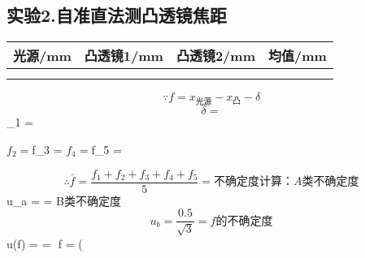 \subsection*{实验2.自准直法测凸透镜焦距}

\begin{center}

\begin{tabular}{|c|c|c|c|}
\hline 
光源/mm &  凸透镜1/mm & 凸透镜2/mm & 均值/mm \\ 
\hline 
{%
{%
{%
{%
& %
{%
{%
\\
\hline

{%
\end{tabular}
\vspace{10pt}

\end{center}
$$\because f = {x}_{\text{光源}} - {x}_{\text{凸}} - \delta$$
$$\delta =  %
$$_1 = %
\begin{center}
${f}_2 = %
${f}_3 = %
${f}_4 = %
${f}_5 = %
\end{center}

$$\therefore \bar{f} = \frac{{f}_1+{f}_2+{f}_3+{f}_4+{f}_5}{5}  = %
不确定度计算： 
A类不确定度 $${u}_a =  =  %
B类不确定度 $${u}_b = \frac{0.5}{\sqrt{3}} = %
f的不确定度
$$u(f) =  =  %
$$  {\therefore}    f = (%